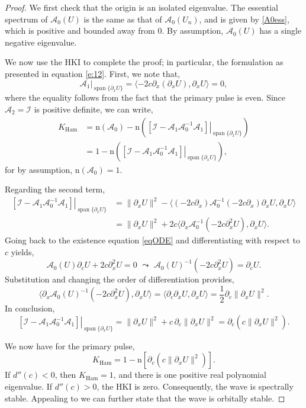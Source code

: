 \documentclass[review,onefignum,onetabnum]{siamart171218}
\def\Ham{\mathop\mathrm{Ham}\nolimits}
\def\Span{\mathop\mathrm{span}\nolimits}
\newcommand{\rmn}{\mathrm{n}}
\newcommand{\calA}{\mathcal{A}}
\newcommand{\calI}{\mathcal{I}}
\begin{document}
\begin{proof}
We first check that the origin is an isolated eigenvalue. The essential spectrum of $\calA_0(U)$ is the same as that of $\calA_0(U_n)$, and is given by \cref{A0ess}, which is positive and bounded away from 0. By assumption, $\calA_0(U)$ has a single negative eigenvalue.

We now use the HKI to complete the proof; in particular, the formulation as presented in equation \cref{e:12}. First, we note that,
\[
\left.\calA_1\right|_{\Span\{\partial_xU\}}=
\langle-2c\partial_x\left(\partial_xU\right),\partial_xU\rangle=0,
\]
where the equality follows from the fact that the primary pulse is even. Since $\calA_2=\calI$ is positive definite, we can write,
\[
\begin{aligned}
K_{\Ham}&=\rmn(\calA_0)-
\rmn\left(\left.\left[\calI-\calA_1\calA_0^{-1}\calA_1\right]\right|_{\Span\{\partial_xU\}}\right)\\
&=1-
\rmn\left(\left.\left[\calI-\calA_1\calA_0^{-1}\calA_1\right]\right|_{\Span\{\partial_xU\}}\right),
\end{aligned}
\]
for by assumption, $\rmn(\calA_0)=1$.

Regarding the second term,
\[
\begin{aligned}
\left.\left[\calI-\calA_1\calA_0^{-1}\calA_1\right]\right|_{\Span\{\partial_xU\}}&=
\|\partial_xU\|^2-
\langle(-2c\partial_x)\calA_0^{-1}(-2c\partial_x)\partial_xU,\partial_xU\rangle\\
&=\|\partial_xU\|^2+
2c\langle\partial_x\calA_0^{-1}(-2c\partial_x^2U),\partial_xU\rangle.
\end{aligned}
\]
Going back to the existence equation \cref{eqODE} and differentiating with respect to $c$ yields,
\[
\calA_0(U)\partial_cU+2c\partial_x^2U=0\,\,\leadsto\,\,
\calA_0(U)^{-1}(-2c\partial_x^2U)=\partial_cU.
\]
Substitution and changing the order of differentiation provides,
\[
\langle\partial_x\calA_0(U)^{-1}(-2c\partial_x^2U),\partial_xU\rangle=
\langle\partial_c\partial_xU,\partial_xU\rangle=\frac{1}{2}\partial_c\|\partial_xU\|^2.
\]
In conclusion,
\[
\left.\left[\calI-\calA_1\calA_0^{-1}\calA_1\right]\right|_{\Span\{\partial_xU\}}=
\|\partial_xU\|^2+c\,\partial_c\|\partial_xU\|^2=
\partial_c\left( c\|\partial_xU\|^2 \right).
\]

We now have for the primary pulse,
\[
K_{\Ham}=1-\rmn\left[\partial_c\left( c\|\partial_xU\|^2 \right)\right].
\]
If $d''(c)<0$, then $K_{\Ham}=1$, and there is one positive real polynomial eigenvalue. If $d''(c)>0$, the HKI is zero. Consequently, the wave is spectrally stable. Appealing to \cite[Theorem~4.1]{bronski:aii14} we can further state that the wave is orbitally stable.
\end{proof}
\end{document}
